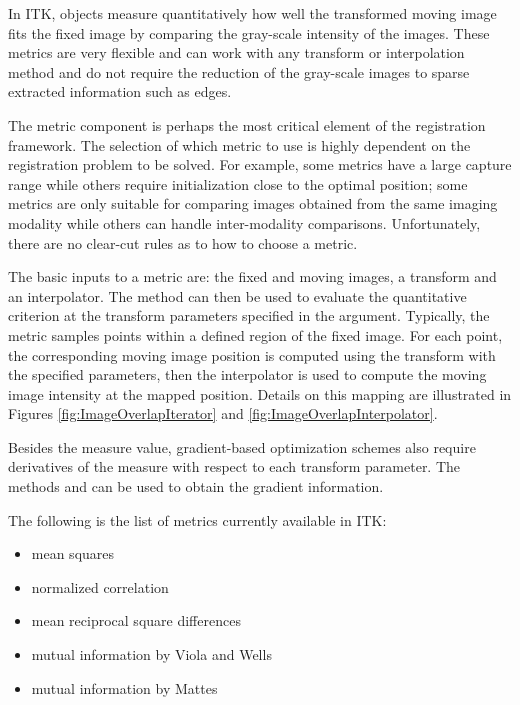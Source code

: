 %
%
%
%


In ITK,  objects measure quantitatively how well
the transformed moving image fits the fixed image by comparing the gray-scale
intensity of the images. These metrics are very flexible and can work with any
transform or interpolation method and do not require the reduction of the
gray-scale images to sparse extracted information such as edges.

The metric component is perhaps the most critical element of the registration
framework. The selection of which metric to use is highly dependent on the
registration problem to be solved. For example, some metrics have a large
capture range while others require initialization close to the optimal
position; some metrics are only suitable for comparing images obtained from the
same imaging modality while others can handle inter-modality comparisons.
Unfortunately, there are no clear-cut rules as to how to choose a metric.


The basic inputs to a metric are: the fixed and moving images, a transform and
an interpolator. The method  can then be used to evaluate the
quantitative criterion at the transform parameters specified in the argument.
Typically, the metric samples points within a defined region of the fixed
image.  For each point, the corresponding moving image position is computed
using the transform with the specified parameters, then the interpolator is
used to compute the moving image intensity at the mapped position. Details on
this mapping are illustrated in Figures \ref{fig:ImageOverlapIterator} and
\ref{fig:ImageOverlapInterpolator}. 

Besides the measure value, gradient-based optimization schemes also require
derivatives of the measure with respect to each transform parameter. The
methods  and  can be
used to obtain the gradient information.


The following is the list of metrics currently available in ITK:
\begin{itemize}
\item mean squares\\ 
\item normalized correlation \\ 
\item mean reciprocal square differences \\  
\item mutual information by Viola and Wells \\ 
\item mutual information by Mattes \\ 
\end{itemize}

